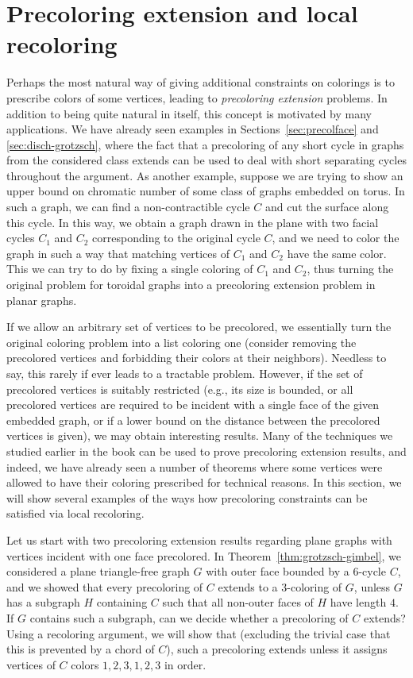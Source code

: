 \documentclass[12pt,twoside,openright,a4paper]{book}
\begin{document}
\section{Precoloring extension and local recoloring}

Perhaps the most natural way of giving additional constraints on colorings is to prescribe colors of some vertices,
leading to \emph{precoloring extension} problems.  In addition to being quite natural in itself, this concept is motivated
by many applications. We have already seen examples in Sections~\ref{sec:precolface} and \ref{sec:disch-grotzsch}, where
the fact that a precoloring of any short cycle in graphs from the considered class extends can be used to deal with short
separating cycles throughout the argument.  As another example, suppose we are trying to show an upper bound on chromatic number
of some class of graphs embedded on torus.  In such a graph, we can find a non-contractible cycle $C$ and cut the surface along this
cycle.  In this way, we obtain a graph drawn in the plane with two facial cycles $C_1$ and $C_2$ corresponding to the original cycle $C$,
and we need to color the graph in such a way that matching vertices of $C_1$ and $C_2$ have the same color. This we can try to do by
fixing a single coloring of $C_1$ and $C_2$, thus turning the original problem for toroidal graphs into a precoloring extension problem
in planar graphs.

If we allow an arbitrary set of vertices to be precolored, we essentially turn the original coloring problem into a list coloring one (consider
removing the precolored vertices and forbidding their colors at their neighbors).  Needless to say, this rarely if ever leads to a tractable
problem.  However, if the set of precolored vertices is suitably restricted (e.g., its size is bounded, or all precolored vertices are
required to be incident with a single face of the given embedded graph, or if a lower bound on the distance between the precolored vertices is given),
we may obtain interesting results.  Many of the techniques we studied earlier in the book can be used to prove precoloring extension
results, and indeed, we have already seen a number of theorems where some vertices were allowed to have their coloring prescribed for technical reasons.
In this section, we will show several examples of the ways how precoloring constraints can be satisfied via local recoloring.

Let us start with two precoloring extension results regarding plane graphs with vertices incident with one face precolored.
In Theorem~\ref{thm:grotzsch-gimbel}, we considered a plane triangle-free graph $G$ with outer face bounded by a $6$-cycle $C$,
and we showed that every precoloring of $C$ extends to a $3$-coloring of $G$, unless
$G$ has a subgraph $H$ containing $C$ such that all non-outer faces of $H$ have length $4$.
If $G$ contains such a subgraph, can we decide whether a precoloring of $C$ extends?
Using a recoloring argument, we will show that (excluding the trivial case that this is prevented by a chord of $C$),
such a precoloring extends unless it assigns vertices of $C$ colors $1,2,3,1,2,3$ in order.
\end{document}
